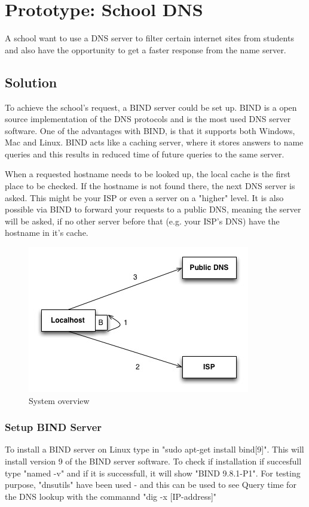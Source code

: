 \documentclass[Preamble]{subfiles}
\begin{document}
\chapter{Prototype: School DNS}
A school want to use a DNS server to filter certain internet sites from students and also have the opportunity to get a faster response from the name server. 

\section{Solution}
To achieve the school's request, a BIND server could be set up. BIND is a open source implementation of the DNS protocols and is the most used DNS server software. One of the advantages with BIND, is that it supports both Windows, Mac and Linux. BIND acts like a caching server, where it stores answers to name queries and this results in reduced time of future queries to the same server.

When a requested hostname needs to be looked up, the local cache is the first place to be checked. If the hostname is not found there, the next DNS server is asked. This might be your ISP or even a server on a "higher" level. It is also possible via BIND to forward your requests to a public DNS, meaning the server will be asked, if no other server before that (e.g. your ISP's DNS) have the hostname in it's cache. 

\begin{figure}[hbtp]
\centering
\includegraphics[scale=0.5]{../../Protoypes/DNS/ForwardingDiagram.jpg}
\caption{System overview}
\end{figure}


\subsection{Setup BIND Server}
To install a BIND server on Linux type in "sudo apt-get install bind[9]". This will install version 9 of the BIND server software. To check if installation if succesfull type "named -v" and if it is successfull, it will show "BIND 9.8.1-P1". For testing purpose, "dnsutils" have been used - and this can be used to see Query time for the DNS lookup with the commannd "dig -x [IP-address]"
\end{document}
